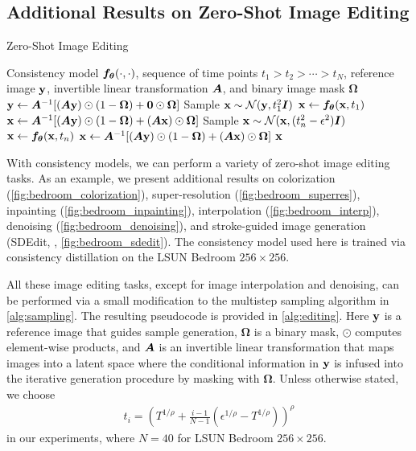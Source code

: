 \begin{appendices}
\section{Additional Results on Zero-Shot Image Editing}\label{app:editing}
\begin{algorithm}[tb]
    \caption{Zero-Shot Image Editing}
    \label{alg:editing}
 \begin{algorithmic}[1]
     Consistency model ${\bm{f}}_{\bm{\theta}}(\cdot, \cdot)$, sequence of time points $t_1 > t_2 > \cdots > t_{N}$, reference image ${\mathbf{y}}$, invertible linear transformation ${\bm{A}}$, and binary image mask $\bm{\Omega}$
    \STATE ${\mathbf{y}} \gets {\bm{A}}^{-1}[({\bm{A}} {\mathbf{y}}) \odot (1 - \bm{\Omega}) + \bm{0} \odot \bm{\Omega}]$
    \STATE Sample ${\mathbf{x}} \sim \mathcal{N}({\mathbf{y}}, t_1^2 {\bm{I}})$
    \STATE ${\mathbf{x}} \gets {\bm{f}}_{\bm{\theta}}({\mathbf{x}}, t_1)$
    \STATE ${\mathbf{x}} \gets {\bm{A}}^{-1}[({\bm{A}} {\mathbf{y}}) \odot (1 - \bm{\Omega}) + ({\bm{A}}{\mathbf{x}}) \odot \bm{\Omega}]$
        \STATE Sample ${\mathbf{x}} \sim \mathcal{N}({\mathbf{x}}, (t_n^2 - \epsilon^2) {\bm{I}})$
        \STATE ${\mathbf{x}} \gets {\bm{f}}_{\bm{\theta}}({\mathbf{x}}, t_n)$
        \STATE ${\mathbf{x}} \gets {\bm{A}}^{-1}[({\bm{A}}{\mathbf{y}}) \odot (1-\bm{\Omega}) + ({\bm{A}}{\mathbf{x}}) \odot \bm{\Omega}]$
    \ENDFOR
     ${\mathbf{x}}$
 \end{algorithmic}
\end{algorithm}

With consistency models, we can perform a variety of zero-shot image editing tasks. As an example, we present additional results on colorization (\cref{fig:bedroom_colorization}), super-resolution (\cref{fig:bedroom_superres}), inpainting (\cref{fig:bedroom_inpainting}), interpolation (\cref{fig:bedroom_interp}), denoising (\cref{fig:bedroom_denoising}), and stroke-guided image generation (SDEdit, \citet{meng2021sdedit}, \cref{fig:bedroom_sdedit}). The consistency model used here is trained via consistency distillation on the LSUN Bedroom $256\times 256$.

All these image editing tasks, except for image interpolation and denoising, can be performed via a small modification to the multistep sampling algorithm in \cref{alg:sampling}. The resulting pseudocode is provided in \cref{alg:editing}. Here ${\mathbf{y}}$ is a reference image that guides sample generation, $\bm{\Omega}$ is a binary mask, $\odot$ computes element-wise products, and ${\bm{A}}$ is an invertible linear transformation that maps images into a latent space where the conditional information in ${\mathbf{y}}$ is infused into the iterative generation procedure by masking with $\bm{\Omega}$. Unless otherwise stated, we choose
\begin{align*}
    t_i = \left(T^{1/\rho} + \frac{i-1}{N-1}(\epsilon^{1/\rho} - T^{1/\rho})\right)^\rho
\end{align*}
in our experiments, where $N=40$ for LSUN Bedroom $256\times 256$.


\end{appendices}
